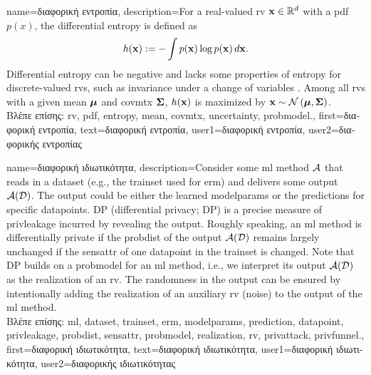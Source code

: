 {name={\foreignlanguage{greek}{διαφορική εντροπία}},
	description={For a real-valued \gls{rv} ${\bf x} \in \mathbb{R}^{d}$ 
		with a \gls{pdf} $p(x)$, the differential \gls{entropy} is defined as \cite{coverthomas}
		\[
		h({\bf x}) := - \int p({\bf x}) \log p({\bf x}) \, d{\bf x}.
		\]
		Differential \gls{entropy} can be negative and lacks some properties of \gls{entropy} for 
		discrete-valued \gls{rv}s, such as invariance under a change of variables \cite{coverthomas}. 
		Among all \gls{rv}s with a given \gls{mean} ${\bm \mu}$ and \gls{covmtx} ${\bf \Sigma}$, 
		$h({\bf x})$ is maximized by ${\bf x} \sim \mathcal{N}\left({\bm \mu},{\bf \Sigma}\right)$. \\
		\foreignlanguage{greek}{Βλέπε επίσης:} \gls{rv}, \gls{pdf}, \gls{entropy}, \gls{mean}, \gls{covmtx}, \gls{uncertainty}, \gls{probmodel}.},
	first={\foreignlanguage{greek}{διαφορική εντροπία}},
	text={\foreignlanguage{greek}{διαφορική εντροπία}},
	user1={\foreignlanguage{greek}{διαφορική εντροπία}}, %
  	user2={\foreignlanguage{greek}{διαφορικής εντροπίας}} %
}

{name={\foreignlanguage{greek}{διαφορική ιδιωτικότητα}},
 	description={Consider 
		some \gls{ml} method $\mathcal{A}$ that reads in a \gls{dataset} (e.g., the \gls{trainset} 
  		used for \gls{erm}) and delivers some output $\mathcal{A}(\mathcal{D})$. The output 
  		could be either the learned \gls{modelparams} or the \gls{prediction}s for specific \gls{datapoint}s. 
  		DP (differential privacy; DP) is a precise measure of \gls{privleakage} incurred by revealing the 
  		output. Roughly speaking, an \gls{ml} method is differentially private if the \gls{probdist} 
  		of the output $\mathcal{A}(\mathcal{D})$ remains largely unchanged if the \gls{sensattr} 
  		of one \gls{datapoint} in the \gls{trainset} is changed. Note that DP 
  		builds on a \gls{probmodel} for an \gls{ml} method, i.e., we interpret its output $\mathcal{A}(\mathcal{D})$ 
  		as the \gls{realization} of an \gls{rv}. The randomness in the output can be ensured 
  		by intentionally adding the \gls{realization} of an auxiliary \gls{rv} (noise) to 
  		the output of the \gls{ml} method.\\
		\foreignlanguage{greek}{Βλέπε επίσης:} \gls{ml}, \gls{dataset}, \gls{trainset}, \gls{erm}, \gls{modelparams}, \gls{prediction}, 
		\gls{datapoint}, \gls{privleakage}, \gls{probdist}, \gls{sensattr}, \gls{probmodel}, \gls{realization}, \gls{rv}, \gls{privattack}, \gls{privfunnel}.}, 
	first={\foreignlanguage{greek}{διαφορική ιδιωτικότητα}},
	text={\foreignlanguage{greek}{διαφορική ιδιωτικότητα}},
	user1={\foreignlanguage{greek}{διαφορική ιδιωτικότητα}}, %
   	user2={\foreignlanguage{greek}{διαφορικής ιδιωτικότητας}} %
}

